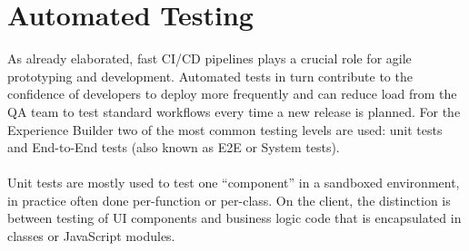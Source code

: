 \section{Automated Testing}
\label{sec:automated-testing}

As already elaborated, fast CI/CD pipelines plays a crucial role for agile prototyping and development.
Automated tests in turn contribute to the confidence of developers to deploy more frequently and can reduce load from the QA team to test standard workflows every time a new release is planned.
For the Experience Builder two of the most common testing levels are used: unit tests and End-to-End tests (also known as E2E or System tests).
\\\\
Unit tests are mostly used to test one ``component'' in a sandboxed environment, in practice often done per-function or per-class.
On the client, the distinction is between testing of UI components and business logic code that is encapsulated in classes or JavaScript modules.

